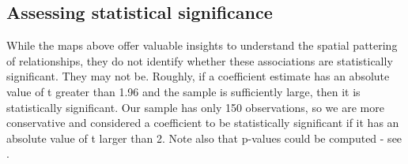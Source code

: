 \documentclass[]{book}
\begin{document}
\subsection{Assessing statistical
significance}\label{assessing-statistical-significance}

While the maps above offer valuable insights to understand the spatial
pattering of relationships, they do not identify whether these
associations are statistically significant. They may not be. Roughly, if
a coefficient estimate has an absolute value of t greater than 1.96 and
the sample is sufficiently large, then it is statistically significant.
Our sample has only 150 observations, so we are more conservative and
considered a coefficient to be statistically significant if it has an
absolute value of t larger than 2. Note also that p-values could be
computed - see \citet{lu2014gwmodel}.
\end{document}
